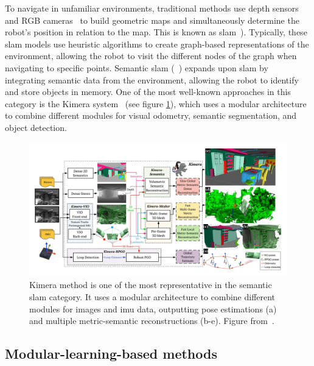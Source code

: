 To navigate in unfamiliar environments, traditional methods use depth sensors~\cite{newcombe2011, thrun2001} and RGB cameras~\cite{jones2011, sattler2018} to build geometric maps and simultaneously determine the robot's position in relation to the map.
This is known as \acrfull{slam}~\cite{Kazerouni2022, campos2021, labbe2022}).
Typically, these \acrshort{slam} models use heuristic algorithms to create graph-based representations of the environment, allowing the robot to visit the different nodes of the graph when navigating to specific points.
Semantic \acrshort{slam} (\eg~\cite{zhang2018, jin2023}) expands upon \acrshort{slam} by integrating semantic data from the environment, allowing the robot to identify and store objects in memory.
One of the most well-known approaches in this category is the Kimera system~\cite{rosinol2020} (see figure \ref{fig:kimera-chart}), which uses a modular architecture to combine different modules for visual odometry, semantic segmentation, and object detection.

\begin{figure}
    \centering
    \includegraphics[width=\textwidth]{figures/related_work/kimera_chart_25 Large}
    \caption[Kimera method for semantic \acrshort{slam}]{Kimera method is one of the most representative in the semantic \acrshort{slam} category.
    It uses a modular architecture to combine different modules for images and \acrfull{imu} data, outputting pose estimations (a) and multiple metric-semantic reconstructions (b-e).
    Figure from~\cite{rosinol2020}.}
    \label{fig:kimera-chart}
\end{figure}

\subsection{Modular-learning-based methods}\label{subsec:modular-learning-based-methods}

